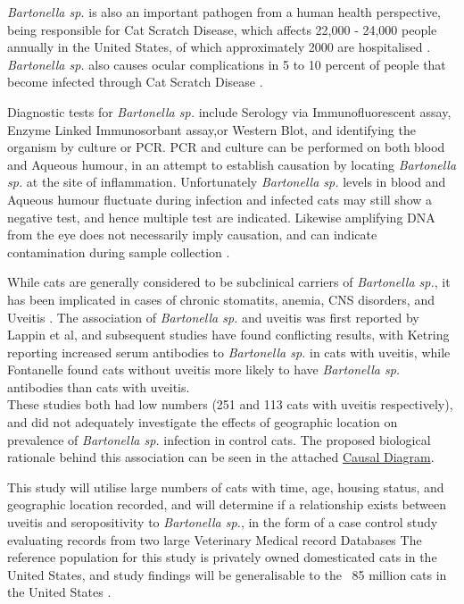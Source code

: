 \documentclass[11pt,twocolumn]{article}
\begin{document}
		\emph{Bartonella sp.} is also an important pathogen from a human health perspective, being responsible for Cat Scratch Disease, which affects 22,000 - 24,000 people annually in the United States, of which approximately 2000 are hospitalised \cite{Jackson1993}.
		\emph{Bartonella sp.} also causes ocular complications in 5 to 10 percent of people that become infected through Cat Scratch Disease \cite{Wade2000}.
	
		Diagnostic tests for \emph{Bartonella sp.} include Serology via Immunofluorescent assay, Enzyme Linked Immunosorbant assay,or Western Blot, and identifying the organism by culture or PCR.
		PCR and culture can be performed on both blood and Aqueous humour, in an attempt to establish causation by locating \emph{Bartonella sp.} at the site of inflammation. Unfortunately \emph{Bartonella sp.} levels in blood and Aqueous humour fluctuate during infection and infected cats may still show a negative test, and hence multiple test are indicated\cite{Guptill2010}. Likewise amplifying DNA from the eye does not necessarily imply causation, and can indicate contamination during sample collection \cite{Powell2010}.


		While cats are generally considered to be subclinical carriers of \emph{Bartonella sp.}, it has been implicated in cases of chronic stomatits, anemia, CNS disorders, and Uveitis \cite{Nasir2005}.
		The association of \emph{Bartonella sp.} and uveitis was first reported by Lappin et al\cite{Lappin1999}, and subsequent studies have found conflicting results, with Ketring reporting increased serum antibodies to \emph{Bartonella sp.} in cats with uveitis\cite{Ketring2004}, while Fontanelle found cats without uveitis more likely to have \emph{Bartonella sp.} antibodies than cats with uveitis.\\
		These studies both had low numbers (251 and 113 cats with uveitis respectively), and did not adequately investigate the effects of geographic location on prevalence of \emph{Bartonella sp.} infection in control cats.
		The proposed biological rationale behind this association can be seen in the attached \hyperref[fig:1]{Causal Diagram}.
	
		This study will utilise large numbers of cats with time, age, housing status, and geographic location recorded, and will determine if a relationship exists between uveitis and seropositivity to  \emph{Bartonella sp.}, in the form of a case control study evaluating records from two large Veterinary Medical record Databases \cite{bark12,UniversityVeterinary}	
		The reference population for this study is privately owned domesticated cats in the United States, and study findings will be generalisable to the ~85 million cats in the United States \cite{HSUSown}.
		
\end{document}
